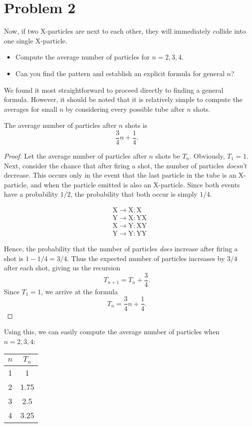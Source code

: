 \section{Problem 2}
\hypertarget{p2}{}
Now, if two X-particles are next to each other, they will immediately collide into one single X-particle.
\begin{itemize}
  \item Compute the average number of particles for $n = 2, 3, 4$.
  \item Can you find the pattern and establish an explicit formula for general $n$?
\end{itemize}

We found it most straightforward to proceed directly to finding a general formula. However, it should be noted that it is relatively simple to compute the averages for small $n$ by considering every possible tube after $n$ shots.

\begin{theorem}\label{thm:2}
  The average number of particles after $n$ shots is \[
  \frac{3}{4}n + \frac{1}{4}
  .\]
\end{theorem}
\begin{proof}
  Let the average number of particles after $n$ shots be $T_n$. Obviously, $T_1 = 1$. Next, consider the chance that after firing a shot, the number of particles \emph{doesn't} decrease. This occurs only in the event that the last particle in the tube is an X-particle, and when the particle emitted is also an X-particle. Since both events have a probability $1 / 2$, the probability that both occur is simply $1 / 4$. 
  \begin{figure}[H]
    \vspace{-1.5em}
    \begin{align*}
    &\text{X} \to \text{X}: \text{X} \\
    &\text{Y} \to \text{X}: \text{YX} \\
    &\text{X} \to \text{Y}: \text{XY} \\
    &\text{Y} \to \text{Y}: \text{YY}
    \end{align*}
    \vspace{-3em}
  \end{figure}
  Hence, the probability that the number of particles \emph{does} increase after firing a shot is $1 -1 / 4 = 3 / 4$. Thus the expected number of particles increases by $3 / 4$ after each shot, giving us the recursion \[
    T_{n+1} = T_{n} + \frac{3}{4}
  .\] Since $T_1 = 1$, we arrive at the formula \[
    T_{n} = \frac{3}{4}n + \frac{1}{4} \tag*{\qedhere}
  .\] 
\end{proof}

Using this, we can easily compute the average number of particles when $n = 2, 3, 4$:
\begin{table}[H]
  \centering
  \begin{tabular}{cc}
    \toprule
    $n$ & $T_n$ \\
    \midrule
    1 & 1 \\
    2 & 1.75 \\
    3 & 2.5 \\
    4 & 3.25 \\
    \bottomrule
  \end{tabular}
\end{table}

